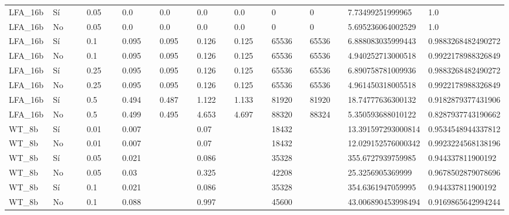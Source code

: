 {{\begin{longtable}{M{0.09\linewidth}M{0.09\linewidth}M{0.09\linewidth}M{0.09\linewidth}M{0.09\linewidth}M{0.09\linewidth}M{0.09\linewidth}M{0.09\linewidth}M{0.09\linewidth}M{0.09\linewidth}M{0.09\linewidth}}
LFA\_16b & Sí & \num{0.05} & \num{0.0} & \num{0.0} & \num{0.0} & \num{0.0} & \num{0} & \num{0} & \num{7.73499251999965} & \num{1.0} \\
LFA\_16b & No & \num{0.05} & \num{0.0} & \num{0.0} & \num{0.0} & \num{0.0} & \num{0} & \num{0} & \num{5.695236064002529} & \num{1.0} \\
LFA\_16b & Sí & \num{0.1} & \num{0.095} & \num{0.095} & \num{0.126} & \num{0.125} & \num{65536} & \num{65536} & \num{6.888083035999443} & \num{0.9883268482490272} \\
LFA\_16b & No & \num{0.1} & \num{0.095} & \num{0.095} & \num{0.126} & \num{0.125} & \num{65536} & \num{65536} & \num{4.940252713000518} & \num{0.9922178988326849} \\
LFA\_16b & Sí & \num{0.25} & \num{0.095} & \num{0.095} & \num{0.126} & \num{0.125} & \num{65536} & \num{65536} & \num{6.890758781009936} & \num{0.9883268482490272} \\
LFA\_16b & No & \num{0.25} & \num{0.095} & \num{0.095} & \num{0.126} & \num{0.125} & \num{65536} & \num{65536} & \num{4.961450318005518} & \num{0.9922178988326849} \\
LFA\_16b & Sí & \num{0.5} & \num{0.494} & \num{0.487} & \num{1.122} & \num{1.133} & \num{81920} & \num{81920} & \num{18.74777636300132} & \num{0.9182879377431906} \\
LFA\_16b & No & \num{0.5} & \num{0.499} & \num{0.495} & \num{4.653} & \num{4.697} & \num{88320} & \num{88324} & \num{5.350593688010122} & \num{0.8287937743190662} \\
WT\_8b & Sí & \num{0.01} & \num{0.007} &   & \num{0.07} &   & \num{18432} &   & \num{13.391597293000814} & \num{0.9534548944337812} \\
WT\_8b & No & \num{0.01} & \num{0.007} &   & \num{0.07} &   & \num{18432} &   & \num{12.029152576000342} & \num{0.9923224568138196} \\
WT\_8b & Sí & \num{0.05} & \num{0.021} &   & \num{0.086} &   & \num{35328} &   & \num{355.6727939759985} & \num{0.944337811900192} \\
WT\_8b & No & \num{0.05} & \num{0.03} &   & \num{0.325} &   & \num{42208} &   & \num{25.3256905369999} & \num{0.9678502879078696} \\
WT\_8b & Sí & \num{0.1} & \num{0.021} &   & \num{0.086} &   & \num{35328} &   & \num{354.6361947059995} & \num{0.944337811900192} \\
WT\_8b & No & \num{0.1} & \num{0.088} &   & \num{0.997} &   & \num{45600} &   & \num{43.006890453998494} & \num{0.9169865642994244} \\

\end{longtable}}}
